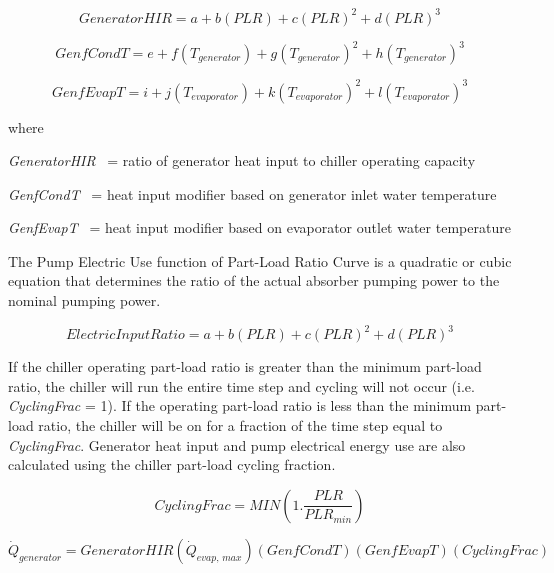 \begin{equation}
GeneratorHIR = a + b\left( {PLR} \right) + c{\left( {PLR} \right)^2} + d{\left( {PLR} \right)^3}
\end{equation}

\begin{equation}
GenfCondT = e + f\left( {{T_{generator}}} \right) + g{\left( {{T_{generator}}} \right)^2} + h{\left( {{T_{generator}}} \right)^3}
\end{equation}

\begin{equation}
GenfEvapT = i + j\left( {{T_{evaporator}}} \right) + k{\left( {{T_{evaporator}}} \right)^2} + l{\left( {{T_{evaporator}}} \right)^3}
\end{equation}

where

\emph{GeneratorHIR}~ = ratio of generator heat input to chiller operating capacity

\emph{GenfCondT}~ = heat input modifier based on generator inlet water temperature

\emph{GenfEvapT}~ = heat input modifier based on evaporator outlet water temperature

The Pump Electric Use function of Part-Load Ratio Curve is a quadratic or cubic equation that determines the ratio of the actual absorber pumping power to the nominal pumping power.

\begin{equation}
ElectricInputRatio = a + b\left( {PLR} \right) + c{\left( {PLR} \right)^2} + d{\left( {PLR} \right)^3}
\end{equation}

If the chiller operating part-load ratio is greater than the minimum part-load ratio, the chiller will run the entire time step and cycling will not occur (i.e. \emph{CyclingFrac} = 1). If the operating part-load ratio is less than the minimum part-load ratio, the chiller will be on for a fraction of the time step equal to \emph{CyclingFrac}. Generator heat input and pump electrical energy use are also calculated using the chiller part-load cycling fraction.

\begin{equation}
CyclingFrac = MIN\left( {1.\frac{{PLR}}{{PL{R_{min}}}}} \right)
\end{equation}

\begin{equation}
{\dot Q_{generator}} = GeneratorHIR\left( {{{\dot Q}_{evap,\,max}}} \right)\left( {GenfCondT} \right)\left( {GenfEvapT} \right)\left( {CyclingFrac} \right)
\end{equation}

